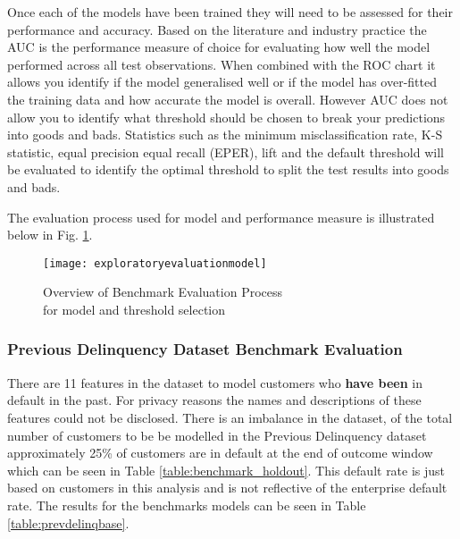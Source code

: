Once each of the models have been trained they will need to be assessed for their performance and accuracy. Based on the literature and industry practice the AUC is the performance measure of choice for evaluating how well the model performed across all test observations. When combined with the ROC chart it allows you identify if the model generalised well or if the model has over-fitted the training data and how accurate the model is overall. However AUC does not allow you to identify what threshold should be chosen to break your predictions into goods and bads. Statistics such as the minimum misclassification rate, K-S statistic, equal precision equal recall (EPER), lift and the default threshold will be evaluated to identify the optimal threshold to split the test results into goods and bads. 

The evaluation process used for model and performance measure is illustrated below in Fig. \ref{fig:exploratoryevaluationmodel}. 

\begin{figure}[H]
	\texttt{[image: exploratoryevaluationmodel]}
	\caption{Overview of Benchmark Evaluation Process\\for model and threshold selection}
	\label{fig:exploratoryevaluationmodel}
\end{figure}

\subsubsection{Previous Delinquency Dataset Benchmark Evaluation}

There are 11 features in the dataset to model customers who \textbf{have been} in default in the past. For privacy reasons the names and descriptions of these features could not be disclosed. There is an imbalance in the dataset, of the total number of customers to be be modelled in the Previous Delinquency dataset approximately 25\% of customers are in default at the end of outcome window which can be seen in Table \ref{table:benchmark_holdout}. This default rate is just based on customers in this analysis and is not reflective of the enterprise default rate. The results for the benchmarks models can be seen in Table \ref{table:prevdelinqbase}.

